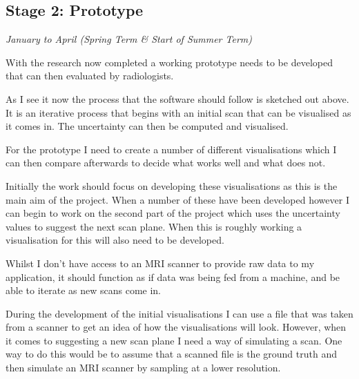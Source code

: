 \documentclass[
  oneside,
  11pt, a4paper,
  footinclude=true,
  headinclude=true,
  cleardoublepage=empty
]{scrbook}
\begin{document}
\subsection*{Stage 2: Prototype}
\textit{January to April (Spring Term \& Start of Summer Term)}

With the research now completed a working prototype needs to be developed that can then evaluated by radiologists.

As I see it now the process that the software should follow is sketched out above. It is an iterative process that begins with an initial scan that can be visualised as it comes in. The uncertainty can then be computed and visualised.

For the prototype I need to create a number of different visualisations which I can then compare afterwards to decide what works well and what does not.

Initially the work should focus on developing these visualisations as this is the main aim of the project. When a number of these have been developed however I can begin to work on the second part of the project which uses the uncertainty values to suggest the next scan plane. When this is roughly working a visualisation for this will also need to be developed.

Whilst I don’t have access to an MRI scanner to provide raw data to my application, it should function as if data was being fed from a machine, and be able to iterate as new scans come in.

During the development of the initial visualisations I can use a file that was taken from a scanner to get an idea of how the visualisations will look. However, when it comes to suggesting a new scan plane I need a way of simulating a scan. One way to do this would be to assume that a scanned file is the ground truth and then simulate an MRI scanner by sampling at a lower resolution.
\end{document}
